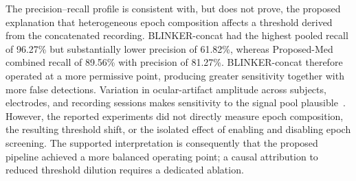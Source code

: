 The precision--recall profile is consistent with, but does not prove, the proposed explanation that heterogeneous epoch composition affects a threshold derived from the concatenated recording. BLINKER-concat had the highest pooled recall of 96.27\% but substantially lower precision of 61.82\%, whereas Proposed-Med combined recall of 89.56\% with precision of 81.27\%. BLINKER-concat therefore operated at a more permissive point, producing greater sensitivity together with more false detections. Variation in ocular-artifact amplitude across subjects, electrodes, and recording sessions makes sensitivity to the signal pool plausible~\citep{croft2000removal,guttmann2019new,klein2013reliable,kleifges2017blinker}. However, the reported experiments did not directly measure epoch composition, the resulting threshold shift, or the isolated effect of enabling and disabling epoch screening. The supported interpretation is consequently that the proposed pipeline achieved a more balanced operating point; a causal attribution to reduced threshold dilution requires a dedicated ablation.
